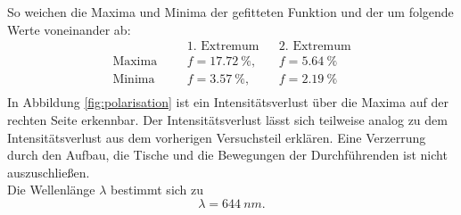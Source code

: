 So weichen die Maxima und Minima der gefitteten Funktion und der um folgende Werte voneinander ab:
\begin{align*}
              &&& \text{1. Extremum}  && \text{2. Extremum}    \\
\text{Maxima} &&& f=\SI{17.72}{\%},   && f=\SI{5.64}{\%} \\
\text{Minima} &&& f=\SI{3.57}{\%},    && f=\SI{2.19}{\%} \\
\end{align*}
In Abbildung \ref{fig:polarisation} ist ein Intensitätsverlust über die Maxima auf der rechten Seite erkennbar.
Der Intensitätsverlust lässt sich teilweise analog zu dem Intensitätsverlust aus dem vorherigen Versuchsteil erklären.
Eine Verzerrung durch den Aufbau, die Tische und die Bewegungen der Durchführenden ist nicht auszuschließen.\\
Die Wellenlänge $\lambda$ bestimmt sich zu
\begin{equation*}
  \lambda=\SI{644}{nm}.
\end{equation*}
